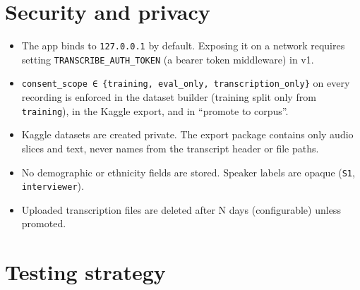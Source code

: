 \documentclass[11pt]{article}
\begin{document}
\hypertarget{security-and-privacy}{%
\section{Security and privacy}\label{security-and-privacy}}

\begin{itemize}
\tightlist
\item
  The app binds to \texttt{127.\allowbreak{}0.\allowbreak{}0.\allowbreak{}1} by default. Exposing it on a network requires setting \texttt{TRANSCRIBE\_\allowbreak{}AUTH\_\allowbreak{}TOKEN} (a bearer token middleware) in v1.
\item
  \texttt{consent\_\allowbreak{}scope ∈ \{training,\allowbreak{} eval\_\allowbreak{}only,\allowbreak{} transcription\_\allowbreak{}only\}} on every recording is enforced in the dataset builder (training split only from \texttt{training}), in the Kaggle export, and in ``promote to corpus''.
\item
  Kaggle datasets are created private. The export package contains only audio slices and text, never names from the transcript header or file paths.
\item
  No demographic or ethnicity fields are stored. Speaker labels are opaque (\texttt{S1}, \texttt{interviewer}).
\item
  Uploaded transcription files are deleted after N days (configurable) unless promoted.
\end{itemize}

\hypertarget{testing-strategy}{%
\section{Testing strategy}\label{testing-strategy}}
\end{document}
